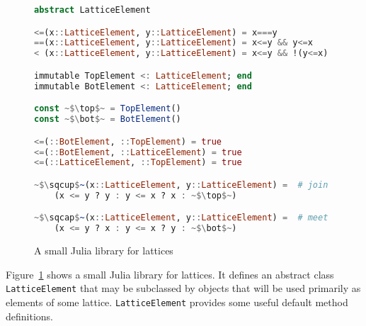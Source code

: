 \begin{figure}[!t]
  \begin{center}
\begin{singlespace}
\begin{lstlisting}[language=julia]
abstract LatticeElement

<=(x::LatticeElement, y::LatticeElement) = x===y
==(x::LatticeElement, y::LatticeElement) = x<=y && y<=x
< (x::LatticeElement, y::LatticeElement) = x<=y && !(y<=x)

immutable TopElement <: LatticeElement; end
immutable BotElement <: LatticeElement; end

const ~$\top$~ = TopElement()
const ~$\bot$~ = BotElement()

<=(::BotElement, ::TopElement) = true
<=(::BotElement, ::LatticeElement) = true
<=(::LatticeElement, ::TopElement) = true

~$\sqcup$~(x::LatticeElement, y::LatticeElement) =  # join
    (x <= y ? y : y <= x ? x : ~$\top$~)

~$\sqcap$~(x::LatticeElement, y::LatticeElement) =  # meet
    (x <= y ? x : y <= x ? y : ~$\bot$~)
\end{lstlisting}
\end{singlespace}
  \end{center}
  \label{julialattices}
  \caption{A small Julia library for lattices}
\end{figure}

Figure~\ref{julialattices} shows a small Julia library for lattices.
It defines an abstract class \texttt{LatticeElement} that may be subclassed
by objects that will be used primarily as elements of some lattice.
\texttt{LatticeElement} provides some useful default method definitions.

\fi
